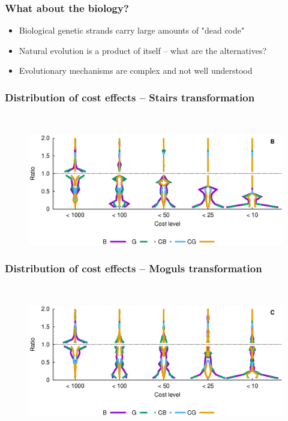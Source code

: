 \documentclass{beamer}
\theoremstyle{plain}
\theoremstyle{definition}
\begin{document}
   \begin{frame}
      \frametitle{What about the biology?}
      \begin{itemize}
         \item Biological genetic strands carry large amounts of "dead code"
         \item Natural evolution is a product of itself -- what are the alternatives?
         \item Evolutionary mechanisms are complex and not well understood
      \end{itemize}
   \end{frame}
\begin{frame}
   \frametitle{Distribution of cost effects -- Stairs transformation}
   \vspace{2.5cm}
   \hspace{-4cm}~\begin{figure}
      \hspace{-4.5em}
      \includegraphics[trim=0 3cm 0 0,scale=.65]{ladder_histo}
      \hspace{-4em}
   \end{figure}
   \vspace{-3.5cm}
\end{frame}
\begin{frame}
   \frametitle{Distribution of cost effects -- Moguls transformation}
   \vspace{2.5cm}
   \hspace{-4cm}~\begin{figure}
      \hspace{-4.5em}
      \includegraphics[trim=0 4cm 0 0,scale=.65]{sinusoidal_histo}
      \hspace{-4em}
   \end{figure}
   \vspace{-3.5cm}
\end{frame}
\end{document}
